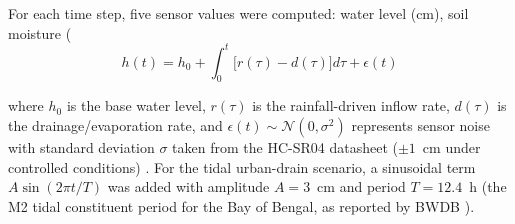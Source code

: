 \documentclass[5p,twocolumn]{elsarticle}
\begin{document}
\begin{table}[htbp]
  \caption{FFWC water level gauge stations in the Dhaka area. Danger levels (DL) in metres above Public Works Datum (mPWD). Data from FFWC Annual Flood Report 2021 \cite{ffwc2021}.}
  \label{tab:ffwc_stations}
  \centering
  \scriptsize
\end{table}

For each time step, five sensor values were computed: water level (cm), soil moisture (\\%

\begin{equation}
  h(t) = h_0 + \int_0^t \big[r(\tau) - d(\tau)\big] d\tau + \epsilon(t)
  \label{eq:water_model}
\end{equation}

where $h_0$ is the base water level, $r(\tau)$ is the rainfall-driven inflow rate, $d(\tau)$ is the drainage/evaporation rate, and $\epsilon(t) \sim \mathcal{N}(0, \sigma^2)$ represents sensor noise with standard deviation $\sigma$ taken from the HC-SR04 datasheet ($\pm1$~cm under controlled conditions) \cite{hcsr04}. For the tidal urban-drain scenario, a sinusoidal term $A\sin(2\pi t / T)$ was added with amplitude $A=3$~cm and period $T=12.4$~h (the M2 tidal constituent period for the Bay of Bengal, as reported by BWDB \cite{bwdb2022,ffwc2021}).
\end{document}
